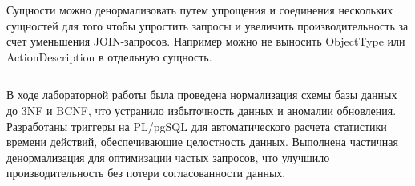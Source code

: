 \newpage
{}
Сущности можно денормализовать путем упрощения и соединения нескольких сущностей для того чтобы упростить запросы и увеличить производительность за счет уменьшения JOIN-запросов. Например можно не выносить ObjectType или ActionDescription в отдельную сущность.

\newpage
{}

\begin{lstlisting}

\end{lstlisting}


В ходе лабораторной работы была проведена нормализация схемы базы данных до 3NF и BCNF, что устранило избыточность данных и аномалии обновления. Разработаны триггеры на PL/pgSQL для автоматического расчета статистики времени действий, обеспечивающие целостность данных. Выполнена частичная денормализация для оптимизации частых запросов, что улучшило производительность без потери согласованности данных.

